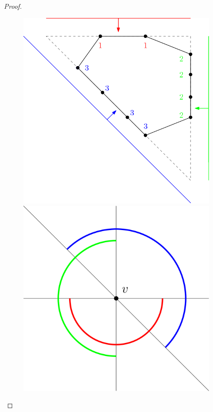 \begin{proof}
\begin{figure}
  \centering
  \begin{minipage}{0.4\textwidth}
  \centering
    \includegraphics[width=0.9\textwidth]{sweeplines1.png}
    \caption{}
    \label{sweeplines1}
  \end{minipage}
  \hfill
  \begin{minipage}{0.4\textwidth}
  \centering
    \includegraphics[width=0.9\textwidth]{sweeplines2.png}
    \caption{}
    \label{sweeplines2}
  \end{minipage}
\end{figure}


\end{proof}
